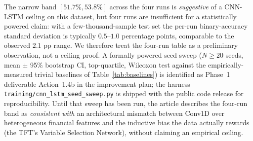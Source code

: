 \documentclass[conference]{IEEEtran}
\begin{document}
The narrow band $[51.7\%, 53.8\%]$ across the four runs is \emph{suggestive} of a CNN-LSTM ceiling on this dataset, but four runs are insufficient for a statistically powered claim: with a few-thousand-sample test set the per-run binary-accuracy standard deviation is typically $0.5$--$1.0$ percentage points, comparable to the observed $2.1$ pp range. We therefore treat the four-run table as a preliminary observation, not a ceiling proof. A formally powered seed sweep ($N \ge 20$ seeds, mean $\pm$ 95\% bootstrap CI, top-quartile, Wilcoxon test against the empirically-measured trivial baselines of Table~\ref{tab:baselines}) is identified as Phase~1 deliverable Action~1.4b in the improvement plan; the harness \texttt{training/cnn\_lstm\_seed\_sweep.py} is shipped with the public code release for reproducibility. Until that sweep has been run, the article describes the four-run band as \emph{consistent with} an architectural mismatch between Conv1D over heterogeneous financial features and the inductive bias the data actually rewards (the TFT's Variable Selection Network), without claiming an empirical ceiling.
\end{document}
